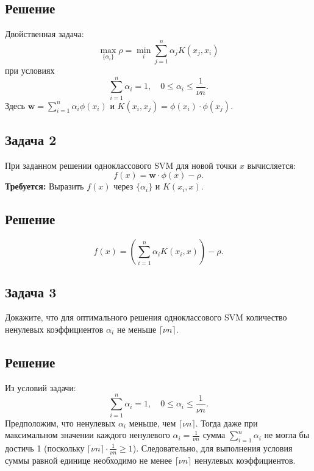 \subsection{Решение}
Двойственная задача:
\[
\max_{\{\alpha_i\}} \rho = \min_i \sum_{j=1}^n \alpha_j K(x_j,x_i)
\]
при условиях
\[
\sum_{i=1}^n \alpha_i = 1,\quad 0 \le \alpha_i \le \frac{1}{\nu n}.
\]
Здесь $\mathbf{w} = \sum_{i=1}^n \alpha_i \phi(x_i)$ и $K(x_i,x_j)=\phi(x_i)\cdot \phi(x_j)$.

\hrulefill

\subsection{Задача 2}
При заданном решении одноклассового SVM для новой точки $x$ вычисляется:
\[
f(x)=\mathbf{w}\cdot\phi(x)-\rho.
\]
\textbf{Требуется:} Выразить $f(x)$ через $\{\alpha_i\}$ и $K(x_i,x)$.

\subsection{Решение}
\[
f(x) = \left(\sum_{i=1}^n \alpha_i K(x_i,x)\right) - \rho.
\]

\hrulefill

\subsection{Задача 3}
Докажите, что для оптимального решения одноклассового SVM количество ненулевых коэффициентов $\alpha_i$ не меньше $\lceil\nu n\rceil$.

\subsection{Решение}
Из условий задачи:
\[
\sum_{i=1}^n \alpha_i = 1,\quad 0 \le \alpha_i \le \frac{1}{\nu n}.
\]
Предположим, что ненулевых $\alpha_i$ меньше, чем $\lceil\nu n\rceil$. Тогда даже при максимальном значении каждого ненулевого $\alpha_i = \frac{1}{\nu n}$ сумма $\sum_{i=1}^n \alpha_i$ не могла бы достичь 1 (поскольку $\lceil \nu n \rceil \cdot \frac{1}{\nu n}\ge1$). Следовательно, для выполнения условия суммы равной единице необходимо не менее $\lceil\nu n\rceil$ ненулевых коэффициентов.

